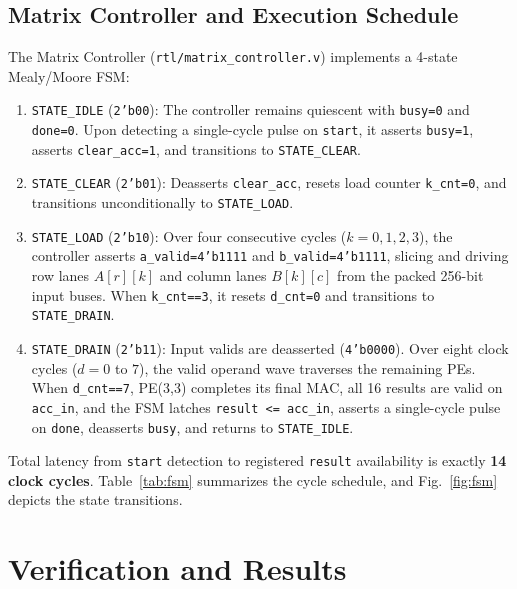 \documentclass[conference]{IEEEtran}
\begin{document}
\subsection{Matrix Controller and Execution Schedule}
The Matrix Controller (\texttt{rtl/matrix\_controller.v}) implements a 4-state Mealy/Moore FSM:
\begin{enumerate}
    \item \texttt{STATE\_IDLE} (\texttt{2'b00}): The controller remains quiescent with \texttt{busy=0} and \texttt{done=0}. Upon detecting a single-cycle pulse on \texttt{start}, it asserts \texttt{busy=1}, asserts \texttt{clear\_acc=1}, and transitions to \texttt{STATE\_CLEAR}.
    \item \texttt{STATE\_CLEAR} (\texttt{2'b01}): Deasserts \texttt{clear\_acc}, resets load counter \texttt{k\_cnt=0}, and transitions unconditionally to \texttt{STATE\_LOAD}.
    \item \texttt{STATE\_LOAD} (\texttt{2'b10}): Over four consecutive cycles ($k=0, 1, 2, 3$), the controller asserts \texttt{a\_valid=4'b1111} and \texttt{b\_valid=4'b1111}, slicing and driving row lanes $A[r][k]$ and column lanes $B[k][c]$ from the packed 256-bit input buses. When \texttt{k\_cnt==3}, it resets \texttt{d\_cnt=0} and transitions to \texttt{STATE\_DRAIN}.
    \item \texttt{STATE\_DRAIN} (\texttt{2'b11}): Input valids are deasserted (\texttt{4'b0000}). Over eight clock cycles ($d=0$ to $7$), the valid operand wave traverses the remaining PEs. When \texttt{d\_cnt==7}, PE(3,3) completes its final MAC, all 16 results are valid on \texttt{acc\_in}, and the FSM latches \texttt{result <= acc\_in}, asserts a single-cycle pulse on \texttt{done}, deasserts \texttt{busy}, and returns to \texttt{STATE\_IDLE}.
\end{enumerate}

Total latency from \texttt{start} detection to registered \texttt{result} availability is exactly \textbf{14 clock cycles}. Table~\ref{tab:fsm} summarizes the cycle schedule, and Fig.~\ref{fig:fsm} depicts the state transitions.

\section{Verification and Results}
\end{document}
